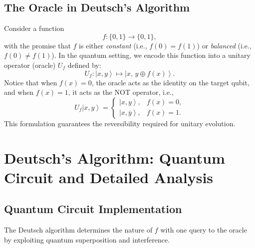 \documentclass[11pt,oneside]{book}
\theoremstyle{remark}
\renewcommand{\ket}[1]{\left|#1\right\rangle}
\begin{document}
	\section{The Oracle in Deutsch's Algorithm}
	
	Consider a function
	\[
	f:\{0,1\} \to \{0,1\},
	\]
	with the promise that $f$ is either \emph{constant} (i.e., $f(0)=f(1)$) or \emph{balanced} (i.e., $f(0)\neq f(1)$). In the quantum setting, we encode this function into a unitary operator (oracle) $U_f$ defined by:
	\[
	U_f \colon \ket{x,y} \mapsto \ket{x,\,y\oplus f(x)}.
	\]
	Notice that when $f(x)=0$, the oracle acts as the identity on the target qubit, and when $f(x)=1$, it acts as the NOT operator, i.e., 
	\[
	U_f \ket{x,y} = \begin{cases}
		\ket{x,y}, & f(x)=0,\\[1mm]
		\ket{x,\overline{y}}, & f(x)=1.
	\end{cases}
	\]
	This formulation guarantees the reversibility required for unitary evolution.
	
	\chapter{Deutsch's Algorithm: Quantum Circuit and Detailed Analysis}
	\section{Quantum Circuit Implementation}
	The Deutsch algorithm determines the nature of $f$ with one query to the oracle by exploiting quantum superposition and interference.
	
\end{document}
